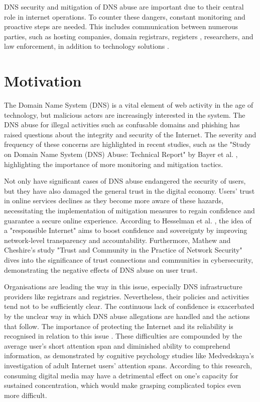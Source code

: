 DNS security and mitigation of DNS abuse are important due to their central role in internet operations. To counter these dangers, constant monitoring and proactive steps are needed. This includes communication between numerous parties, such as hosting companies, domain registrars, registers , researchers, and law enforcement, in addition to technology solutions \cite{holdmann2019}.

\section{Motivation}

The Domain Name System (DNS) is a vital element of web activity in the age of technology, but malicious actors are increasingly interested in the system. The DNS abuse for illegal activities such as confusable domains and phishing has raised questions about the integrity and security of the Internet. The severity and frequency of these concerns are highlighted in recent studies, such as the "Study on Domain Name System (DNS) Abuse: Technical Report" by Bayer et al. \cite{bayer2022}, highlighting the importance of more monitoring and mitigation tactics.

Not only have significant cases of DNS abuse endangered the security of users, but they have also damaged the general trust in the digital economy. Users' trust in online services declines as they become more aware of these hazards, necessitating the implementation of mitigation measures to regain confidence and guarantee a secure online experience. According to Hesselman et al. \cite{hesselman2020}, the idea of a "responsible Internet" aims to boost confidence and sovereignty by improving network-level transparency and accountability. Furthermore, Mathew and Cheshire's \cite{mathew2016} study "Trust and Community in the Practice of Network Security" dives into the significance of trust connections and communities in cybersecurity, demonstrating the negative effects of DNS abuse on user trust.

Organisations are leading the way in this issue, especially DNS infrastructure providers like registrars and registries. Nevertheless, their policies and activities tend not to be sufficiently clear. The continuous lack of confidence is exacerbated by the unclear way in which DNS abuse allegations are handled and the actions that follow. The importance of protecting the Internet and its reliability is recognised in relation to this issue \cite{cerf2022}. These difficulties are compounded by the average user's short attention span and diminished ability to comprehend information, as demonstrated by cognitive psychology studies like Medvedskaya's \cite{medvedskaya2022} investigation of adult Internet users' attention spans. According to this research, consuming digital media may have a detrimental effect on one's capacity for sustained concentration, which would make grasping complicated topics even more difficult.

